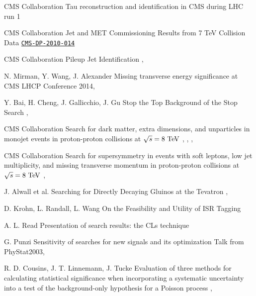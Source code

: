{CMS Collaboration}
{Tau reconstruction and identification in CMS during LHC run 1}
{}

{CMS Collaboration}
{Jet and MET Commissioning Results from 7 TeV Collision Data}
{\href{http://cms.cern.ch/iCMS/jsp/openfile.jsp?type=DP&year=2010&files=DP2010_014.pdf}{\texttt{CMS-DP-2010-014}}}

{CMS Collaboration}
{Pileup Jet Identification}
{, }


{N. Mirman, Y. Wang, J. Alexander}
{Missing transverse energy significance at CMS}
{LHCP Conference 2014, }

{Y. Bai, H. Cheng, J. Gallicchio, J. Gu}
{Stop the Top Background of the Stop Search}
{, }


{CMS Collaboration}
{Search for dark matter, extra dimensions, and unparticles in monojet events in proton-proton collisions at $\sqrt{s} = 8~\text{TeV}$}
{, , , }

{CMS Collaboration}
{Search for supersymmetry in events with soft leptons, low jet multiplicity, and missing
transverse momentum in proton-proton collisions at $\sqrt{s} = 8~\text{TeV}$}
{, }

{J. Alwall et al.}
{Searching for Directly Decaying Gluinos at the Tevatron}
{, }

{D. Krohn, L. Randall, L. Wang}
{On the Feasibility and Utility of ISR Tagging}
{}


{A. L. Read}
{Presentation of search results: the CLs technique}
{}

{G. Punzi}
{Sensitivity of searches for new signals and its optimization}
{Talk from PhyStat2003, }

{R. D. Cousins, J. T. Linnemann, J. Tucke}
{Evaluation of three methods for calculating
statistical significance when incorporating a
systematic uncertainty into a test of the
background-only hypothesis for a Poisson
process}
{, }

